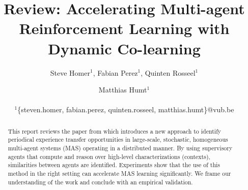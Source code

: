 \documentclass[letterpaper]{article}
\title{Review: Accelerating Multi-agent Reinforcement Learning
with Dynamic Co-learning}
\author{Steve Homer$^1$, Fabian Perez$^1$, Quinten Rosseel$^1$ \and Matthias Humt$^1$ \\
\mbox{}\\
$^1$\{steven.homer, fabian.perez, quinten.rosseel, matthias.humt\}@vub.be}
\begin{document}
\maketitle

\begin{abstract} \label{sec:abstract}
 This report reviews the paper from \cite{garant2015accelerating} which introduces a new approach to identify periodical experience transfer opportunities in large-scale, stochastic, homogeneous multi-agent systems (MAS) operating in a distributed manner. By using supervisory agents that compute and reason over high-level characterizations (contexts), similarities between agents are identified. Experiments show that the use of this method in the right setting can accelerate MAS learning significantly. We frame our understanding of the work and conclude with an empirical validation.
\end{abstract}
\end{document}
